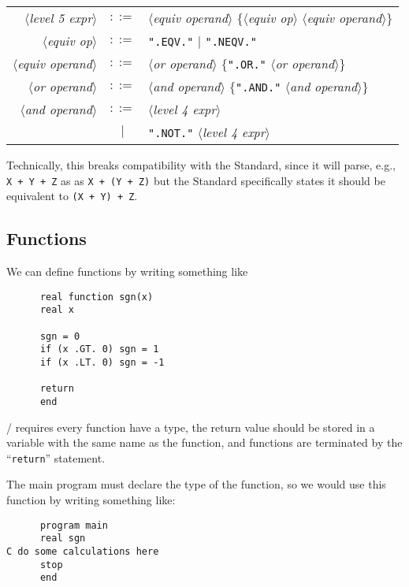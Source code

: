 \begin{tabular}{rcl}
  $\langle$\textit{level 5 expr}$\rangle$ & $::=$ & $\langle$\textit{equiv operand}$\rangle$ $\{\langle$\textit{equiv op}$\rangle$ $\langle$\textit{equiv operand}$\rangle\}$\\
  $\langle$\textit{equiv op}$\rangle$ & $::=$ & \texttt{".EQV."} $\mid$ \texttt{".NEQV."}\\
  $\langle$\textit{equiv operand}$\rangle$ & $::=$ & $\langle$\textit{or operand}$\rangle$
  $\{$\texttt{".OR."} $\langle$\textit{or operand}$\rangle\}$\\
  $\langle$\textit{or operand}$\rangle$ & $::=$ & $\langle$\textit{and operand}$\rangle$
  $\{$\texttt{".AND."} $\langle$\textit{and operand}$\rangle\}$\\
  $\langle$\textit{and operand}$\rangle$ & $::=$ & $\langle$\textit{level 4 expr}$\rangle$\\
  & $\mid$ & \texttt{".NOT."} $\langle$\textit{level 4 expr}$\rangle$\\
\end{tabular}

\medbreak
Technically, this breaks compatibility with the Standard, since it will
parse, e.g., \texttt{X + Y + Z} as 
as \texttt{X + (Y + Z)} but the Standard specifically states it should
be equivalent to \texttt{(X + Y) + Z}.

\subsection{Functions}
We can define functions by writing something like

\begin{lstlisting}
      real function sgn(x)
      real x

      sgn = 0
      if (x .GT. 0) sgn = 1
      if (x .LT. 0) sgn = -1

      return
      end
\end{lstlisting}
\FORTRAN/ requires every function have a type, the return value should
be stored in a variable with the same name as the function, and
functions are terminated by the ``\texttt{return}'' statement.

The main program must declare the type of the function, so we would use
this function by writing something like:
\begin{lstlisting}
      program main
      real sgn
C do some calculations here
      stop
      end
\end{lstlisting}

